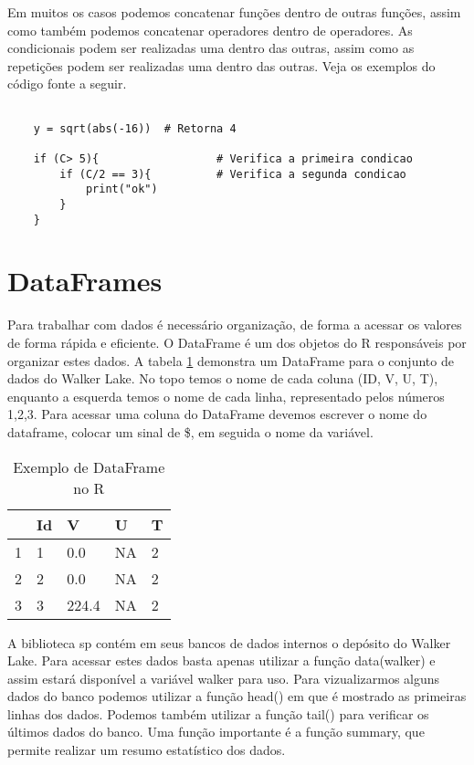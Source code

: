 Em muitos os casos podemos concatenar funções dentro de outras funções, assim como também podemos concatenar operadores dentro de operadores. As condicionais podem ser realizadas uma dentro das outras, assim como as repetições podem ser realizadas uma dentro das outras. Veja os exemplos do código fonte a seguir. 

\begin{scriptsize}
	\estiloR
	\begin{lstlisting}[caption={Criação de um vetor em R}, label=lst:rcode]
	
	y = sqrt(abs(-16))  # Retorna 4
	
	if (C> 5){					# Verifica a primeira condicao
		if (C/2 == 3){			# Verifica a segunda condicao
			print("ok")
		}
	}
	\end{lstlisting}
\end{scriptsize}


\section{DataFrames} 

Para trabalhar com dados é necessário organização, de forma a acessar os valores de forma rápida e eficiente. O DataFrame é um dos objetos do R responsáveis por organizar estes dados. A tabela \ref{dataframe} demonstra um DataFrame para o conjunto de dados do Walker Lake. No topo temos o nome de cada coluna (ID, V, U, T), enquanto a esquerda temos o nome de cada linha, representado pelos números 1,2,3. Para acessar uma coluna do DataFrame devemos escrever o nome do dataframe, colocar um sinal de \$, em seguida o nome da variável.  

\FloatBarrier
\begin{table}[h]
	\centering
	\begin{tabular}{@{}lllll@{}}
		\toprule
		& Id & V & U & T \\ \midrule
		1 & 1 & 0.0 & NA & 2 \\
		2 & 2 & 0.0 & NA & 2 \\
		3 & 3 & 224.4 & NA & 2 \\ \bottomrule
	\end{tabular}
	\caption{Exemplo de DataFrame no R}
	\label{dataframe}
\end{table}
\FloatBarrier

A biblioteca sp contém em seus bancos de dados internos o depósito do Walker Lake. Para acessar estes dados basta apenas utilizar a função data(walker) e assim estará disponível a variável walker para uso. Para vizualizarmos alguns dados do banco podemos utilizar a função head() em que é mostrado as primeiras linhas dos dados. Podemos também utilizar a função tail() para verificar os últimos dados do banco. Uma função importante é a função summary, que permite realizar um resumo estatístico dos dados. 

